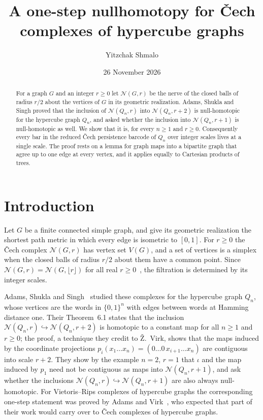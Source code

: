 \documentclass[11pt]{amsart}
\theoremstyle{remark}
\newcommand{\N}{\mathcal{N}}
\begin{document}
\title[One-step nullhomotopy for \v{C}ech complexes]{A one-step nullhomotopy for \v{C}ech complexes of hypercube
graphs}
\author{Yitzchak Shmalo}
\date{26 November 2026}
\address{Einstein Institute of Mathematics, The Hebrew University of Jerusalem, Jerusalem, Israel}

\begin{abstract}
For a graph $G$ and an integer $r\ge0$ let $\N(G,r)$ be the nerve of the closed balls of radius $r/2$ about the vertices
of $G$ in its geometric realization. Adams, Shukla and Singh proved that the inclusion of $\N(Q_n,r)$ into
$\N(Q_n,r+2)$ is null-homotopic for the hypercube graph $Q_n$, and asked whether the inclusion into $\N(Q_n,r+1)$ is
null-homotopic as well. We show that it is, for every $n\ge1$ and $r\ge0$. Consequently every bar in the reduced
\v{C}ech persistence barcode of $Q_n$ over integer scales lives at a single scale. The proof rests on a lemma for graph maps into a
bipartite graph that agree up to one edge at every vertex, and it applies equally to Cartesian products of trees.
\end{abstract}

\maketitle

\section{Introduction}

Let $G$ be a finite connected simple graph, and give its geometric realization the shortest path metric in which every
edge is isometric to $[0,1]$. For $r\ge0$ the \v{C}ech complex $\N(G,r)$ has vertex set $V(G)$, and a set of vertices is
a simplex when the closed balls of radius $r/2$ about them have a common point. Since $\N(G,r)=\N(G,\lfloor r\rfloor)$
for all real $r\ge0$~\cite[Section~2]{ASS}, the filtration is determined by its integer scales.

Adams, Shukla and Singh~\cite{ASS} studied these complexes for the hypercube graph $Q_n$, whose vertices are the words
in $\{0,1\}^n$ with edges between words at Hamming distance one. Their Theorem~6.1 states that the inclusion
$\N(Q_n,r)\hookrightarrow\N(Q_n,r+2)$ is homotopic to a constant map for all $n\ge1$ and $r\ge0$; the proof, a technique
they credit to \v{Z}.~Virk, shows that the maps induced by the coordinate projections
$p_i(x_1\dots x_n)=(0\dots0\,x_{i+1}\dots x_n)$ are contiguous into scale $r+2$. They show by the example $n=2$, $r=1$
that $\iota$ and the map induced by $p_1$ need not be contiguous as maps into $\N(Q_n,r+1)$, and
ask~\cite[Question~7.5]{ASS} whether the inclusions
$\N(Q_n,r)\hookrightarrow\N(Q_n,r+1)$ are also always null-homotopic. For Vietoris--Rips complexes of hypercube graphs
the corresponding one-step statement was proved by Adams and Virk~\cite{AV}, who expected that part of their work would
carry over to \v{C}ech complexes of hypercube graphs.
\end{document}
